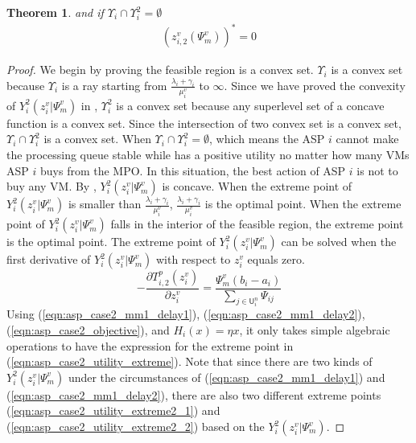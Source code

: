 \documentclass[conference]{IEEEtran}
\newtheorem{theorem}{Theorem}
\begin{document}
\begin{theorem}
and if $\Upsilon_i \cap \Upsilon_i^2 = \emptyset$
\begin{equation}\label{eqn:asp_case2_optimal_solution_individual_rationality}
\begin{aligned}
    (z_{i,2}^{v}(\Psi_m^v))^*=0
\end{aligned}
\end{equation}

\end{theorem}
\begin{proof}
We begin by proving the feasible region is a convex set. $\Upsilon_i$ is a convex set because $\Upsilon_i$ is a ray starting from $\frac{\lambda_i+\gamma_i}{\mu_i^v}$ to $\infty$. Since we have proved the convexity of $Y_i^2(z_i^v|\Psi_m^v)$ in , $\Upsilon_i^2$ is a convex set because any superlevel set of a concave function is a convex set. Since the intersection of two convex set is a convex set, $\Upsilon_i \cap \Upsilon_i^2$ is a convex set. When $\Upsilon_i \cap \Upsilon_i^2 = \emptyset$, which means the ASP $i$ cannot make the processing queue stable while has a positive utility no matter how many VMs ASP $i$ buys from the MPO. In this situation, the best action of ASP $i$ is not to buy any VM. By , $Y_i^2(z_i^v|\Psi_m^v)$ is concave. When the extreme point of $Y_i^2(z_i^v|\Psi_m^v)$ is smaller than $\frac{\lambda_i+\gamma_i}{\mu_i^v}$, $\frac{\lambda_i+\gamma_i}{\mu_i^v}$ is the optimal point. When the extreme point of $Y_i^2(z_i^v|\Psi_m^v)$ falls in the interior of the feasible region, the extreme point is the optimal point. The extreme point of $Y_i^2(z_i^v|\Psi_m^v)$ can be solved when the first derivative of $Y_i^2(z_i^v|\Psi_m^v)$ with respect to $z_i^v$ equals zero.
\begin{equation} \label{eqn:asp_case2_utility_first_deriv}
-\frac{\partial T_{i,2}^p(z_i^v)}{\partial z_i^v} = \frac{\Psi_m^v (b_i - a_i)}{\sum_{j \in \mathsf{U}_i^n} \Psi_{ij}}
\end{equation}
Using (\ref{eqn:asp_case2_mm1_delay1}), (\ref{eqn:asp_case2_mm1_delay2}), (\ref{eqn:asp_case2_objective}), and $H_i(x)=\eta x$, it only takes simple algebraic operations to have the expression for the extreme point in (\ref{eqn:asp_case2_utility_extreme}). Note that since there are two kinds of $Y_i^2(z_i^v|\Psi_m^v)$ under the circumstances of (\ref{eqn:asp_case2_mm1_delay1}) and (\ref{eqn:asp_case2_mm1_delay2}), there are also two different extreme points (\ref{eqn:asp_case2_utility_extreme2_1}) and (\ref{eqn:asp_case2_utility_extreme2_2}) based on the $Y_i^2(z_i^v|\Psi_m^v)$.\qedhere
\end{proof}
\end{document}
